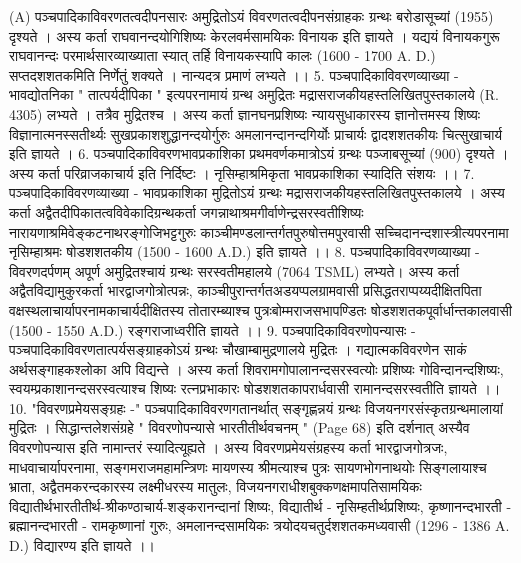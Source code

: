 (A) पञ्चपादिकाविवरणतत्वदीपनसारः 
अमुद्रितोऽयं विवरणतत्वदीपनसंग्राहकः ग्रन्थः बरोडासूच्यां (1955) दृश्यते । अस्य कर्ता राघवानन्दयोगिशिष्यः केरलवर्मसामयिकः विनायक इति ज्ञायते । यद्ययं विनायकगुरू राघवानन्दः परमार्थसारव्याख्याता स्यात् तर्हि विनायकस्यापि कालः (1600 - 1700 A. D.) सप्तदशशतकमिति निर्णेतुं शक्यते । नान्यदत्र प्रमाणं लभ्यते ।। 
5. पञ्चपादिकाविवरणव्याख्या - भावद्योतनिका 
" तात्पर्यदीपिका " इत्यपरनामायं ग्रन्थ अमुद्रितः मद्रासराजकीयहस्तलिखितपुस्तकालये (R. 4305) लभ्यते । तत्रैव मुद्रितश्च । अस्य कर्ता ज्ञानघनप्रशिष्यः न्यायसुधाकारस्य ज्ञानोत्तमस्य शिष्यः विज्ञानात्मनस्सतीर्थ्यः सुखप्रकाशशुद्धानन्दयोर्गुरुः अमलानन्दानन्दगिर्योः प्राचार्यः द्वादशशतकीयः चित्सुखाचार्य इति ज्ञायते । 
6. पञ्चपादिकाविवरणभावप्रकाशिका
प्रथमवर्णकमात्रोऽयं ग्रन्थः पञ्जाबसूच्यां (900) दृश्यते । अस्य कर्ता परिव्राजकाचार्य इति निर्दिष्टः । नृसिम्हाश्रमिकृता भावप्रकाशिका स्यादिति संशयः ।। 
7. पञ्चपादिकाविवरणव्याख्या - भावप्रकाशिका 
मुद्रितोऽयं ग्रन्थः मद्रासराजकीयहस्तलिखितपुस्तकालये । अस्य कर्ता अद्वैतदीपिकातत्वविवेकादिग्रन्थकर्ता जगन्नाथाश्रमगीर्वाणेन्द्रसरस्वतीशिष्यः नारायणाश्रमिवेङ्कटनाथरङ्गोजिभट्टगुरुः काञ्चीमण्डलान्तर्गतपुरुषोत्तमपुरवासी सच्चिदानन्दशास्त्रीत्यपरनामा नृसिम्हाश्रमः षोडशशतकीय  (1500 - 1600 A.D.) इति ज्ञायते ।।
8. पञ्चपादिकाविवरणव्याख्या - विवरणदर्पणम्  
अपूर्ण अमुद्रितश्चायं ग्रन्थः सरस्वतीमहालये (7064 TSML) लभ्यते। अस्य कर्ता अद्वैतविद्यामुकुरकर्ता भारद्वाजगोत्रोत्पन्नः, काञ्चीपुरान्तर्गतअडयप्पलग्रामवासी प्रसिद्धतराप्पय्यदीक्षितपिता वक्षस्थलाचार्यापरनामकाचार्यदीक्षितस्य तोतारम्ब्याश्च पुत्रःबोम्मराजसभापण्डितः षोडशशतकपूर्वार्धान्तकालवासी (1500 - 1550 A.D.) रङ्गराजाध्वरीति ज्ञायते ।। 
9. पञ्चपादिकाविवरणोपन्यासः - 
पञ्चपादिकाविवरणतात्पर्यसङ्ग्राहकोऽयं ग्रन्थः चौखाम्बामुद्रणालये मुद्रितः । गद्यात्मकविवरणेन साकं अर्थसङ्गाहकश्लोका अपि विद्यन्ते । अस्य कर्ता शिवरामगोपालानन्दसरस्वत्योः प्रशिष्यः गोविन्दानन्दशिष्यः, स्वयम्प्रकाशानन्दसरस्वत्याश्च शिष्यः रत्नप्रभाकारः षोडशशतकापरार्धवासी रामानन्दसरस्वतीति ज्ञायते ।।
10. "विवरणप्रमेयसङ्ग्रहः -"
पञ्चपादिकाविवरणगतानर्थात् सङ्गृह्णन्नयं ग्रन्थः विजयनगरसंस्कृतग्रन्थमालायां मुद्रितः । सिद्धान्तलेशसंग्रहे " विवरणोपन्यासे भारतीतीर्थवचनम् " (Page 68) इति दर्शनात् अस्यैव विवरणोपन्यास इति नामान्तरं स्यादित्यूह्यते । अस्य विवरणप्रमेयसंग्रहस्य कर्ता भारद्वाजगोत्रजः, माधवाचार्यापरनामा, सङ्गमराजमहामन्त्रिणः मायणस्य श्रीमत्याश्च पुत्रः सायणभोगनाथयोः सिङ्गलायाश्च भ्राता, अद्वैतमकरन्दकारस्य लक्ष्मीधरस्य मातुलः, विजयनगराधीशबुक्कणक्षमापतिसामयिकः विद्यातीर्थभारतीतीर्थ-श्रीकण्ठाचार्य-शङ्करानन्दानां शिष्यः, विद्यातीर्थ - नृसिम्हतीर्थप्रशिष्यः, कृष्णानन्दभारती - ब्रह्मानन्दभारती - रामकृष्णानां गुरुः, अमलानन्दसामयिकः त्रयोदयचतुर्दशशतकमध्यवासी (1296 - 1386 A. D.) विद्यारण्य इति ज्ञायते ।। 
